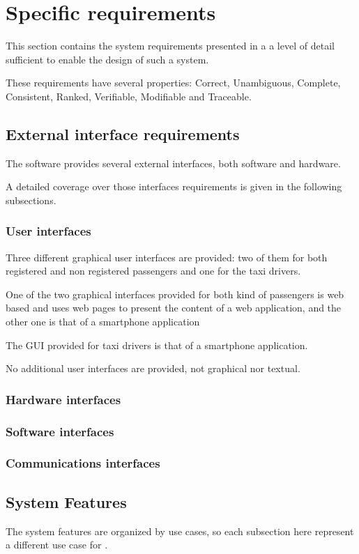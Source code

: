 \section{Specific requirements}
This section contains the system requirements presented in a a level of detail sufficient to enable the design of such a system.\par
These requirements have several properties: Correct, Unambiguous, Complete, Consistent, Ranked, Verifiable, Modifiable and Traceable.
\subsection{External interface requirements}
The software \myTaxiService{} provides several external interfaces, both software and hardware.\par
A detailed coverage over those interfaces requirements is given in the following subsections.
\subsubsection{User interfaces}
Three different graphical user interfaces are provided: two of them for both registered and non registered passengers and one for the taxi drivers.\par
One of the two graphical interfaces provided for both kind of passengers is web based and uses web pages to present the content of a web application, and the other one is that of a smartphone application\par
The GUI provided for taxi drivers is that of a smartphone application.\par
No additional user interfaces are provided, not graphical nor textual.
\subsubsection{Hardware interfaces}
\subsubsection{Software interfaces}
\subsubsection{Communications interfaces}
\subsection{System Features}
The system features are organized by use cases, so each subsection here represent a different use case for \myTaxiService{}.\par
